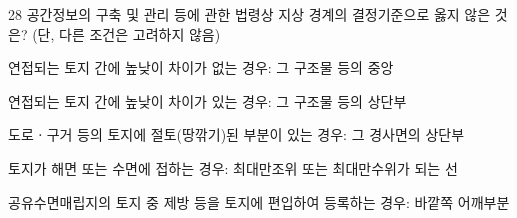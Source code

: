 \begin{question}{28}
공간정보의 구축 및 관리 등에 관한 법령상 지상 경계의 결정기준으로 옳지 않은 것은? (단, 다른 조건은 고려하지 않음)
\begin{choices}
  \item 연접되는 토지 간에 높낮이 차이가 없는 경우: 그 구조물 등의 중앙
  \item 연접되는 토지 간에 높낮이 차이가 있는 경우: 그 구조물 등의 상단부
  \item 도로ㆍ구거 등의 토지에 절토(땅깎기)된 부분이 있는 경우: 그 경사면의 상단부
  \item 토지가 해면 또는 수면에 접하는 경우: 최대만조위 또는 최대만수위가 되는 선
  \item 공유수면매립지의 토지 중 제방 등을 토지에 편입하여 등록하는 경우: 바깥쪽 어깨부분
\end{choices}
\end{question}
